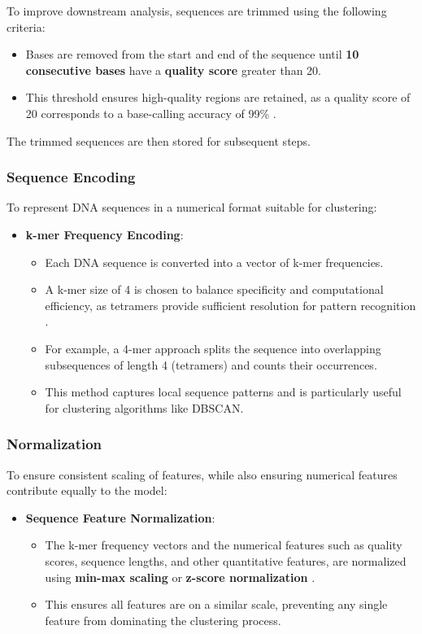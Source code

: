 To improve downstream analysis, sequences are trimmed using the following criteria:

\begin{itemize}
    \item Bases are removed from the start and end of the sequence until \textbf{10 consecutive bases} have a \textbf{quality score} greater than 20.
    \item This threshold ensures high-quality regions are retained, as a quality score of 20 corresponds to a base-calling accuracy of 99\% \cite{quality_score_threshold}.
\end{itemize}

The trimmed sequences are then stored for subsequent steps.

\subsubsection{Sequence Encoding}
To represent DNA sequences in a numerical format suitable for clustering:
\begin{itemize}
    \item \textbf{k-mer Frequency Encoding}:
    \begin{itemize}
        \item Each DNA sequence is converted into a vector of k-mer frequencies.
        \item A k-mer size of 4 is chosen to balance specificity and computational efficiency, as tetramers provide sufficient resolution for pattern recognition \cite{kmer_size_choice}.
        \item For example, a 4-mer approach splits the sequence into overlapping subsequences of length 4 (tetramers) and counts their occurrences.
        \item This method captures local sequence patterns and is particularly useful for clustering algorithms like DBSCAN.
    \end{itemize}
\end{itemize}

\subsubsection{Normalization}
To ensure consistent scaling of features, while also ensuring numerical features contribute equally to the model:
\begin{itemize}
    \item \textbf{Sequence Feature Normalization}:
    \begin{itemize}
        \item The k-mer frequency vectors and the numerical features such as quality scores, sequence lengths, and other quantitative features, are normalized using \textbf{min-max scaling} or \textbf{z-score normalization} \cite{normalization_methods}.
        \item This ensures all features are on a similar scale, preventing any single feature from dominating the clustering process.
    \end{itemize}
\end{itemize}


